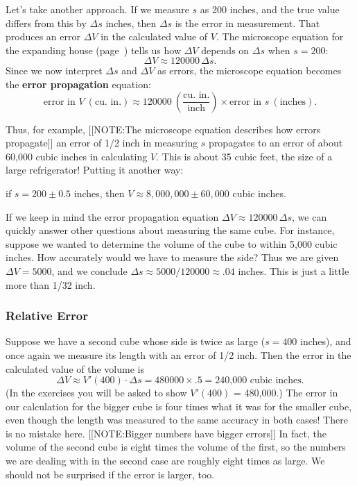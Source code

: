 Let's take another approach.  If we measure $s$ as 200 inches, and the
true value differs from this by $\Delta s$ inches, then $\Delta s$ is
the error in measurement.  That produces an error $\Delta V$ in the
calculated value of $V$.  The microscope equation for the expanding
house (page~\pageref{house}) tells us how $\Delta V$ depends on
$\Delta s$ when $s = 200$:
\[
\Delta V \approx 120000\,\Delta s.
\]
Since we now interpret $\Delta s$ and $\Delta V$ as errors, the
microscope equation becomes the {\bf error propagation} equation:
\[
\mbox{error in $V$} \ (\mbox{cu.\ in.}) \approx 120000 
		\ \left(\dfrac{\mbox{cu.\ in.}}{\mbox{inch}}\right) 
		\times \mbox{error in $s$} \ (\mbox{inches}).
\]

Thus, for example, 
[[NOTE:The microscope equation describes how errors propagate]]
an error of 1/2 inch in measuring $s$ propagates to an error of about
60,000 cubic inches in calculating $V$.  This is about 35 cubic feet,
the size of a large refrigerator!  Putting it another way:
	\begin{center}
	if $s = 200 \pm 0.5$ inches, then $V \approx 8,000,000 
		\pm 60,000$ cubic inches.
	\end{center}

If we keep in mind the error propagation equation $\Delta V \approx
120000\,\Delta s$, we can quickly answer other questions about
measuring the same cube.  For instance, suppose we wanted to determine
the volume of the cube to within 5,000 cubic inches.  How accurately
would we have to measure the side?  Thus we are given $\Delta V =
5000$, and we conclude $\Delta s \approx 5000/120000 \approx .04$
inches.  This is just a little more than 1/32 inch.

\subsubsection{Relative Error}
\label{subsubsec:relative-error}

Suppose we have a second cube whose side is twice as large ($s = 400$
inches), and once again we measure its length with an error of 1/2
inch.  Then the error in the calculated value of the volume is
\[
\Delta V \approx  V'(400) \cdot \Delta s = 
		480000 \times .5 = \mbox{240,000 cubic inches.}
\]
(In the exercises you will be asked to show $V'(400)$ = 480,000.)  The
error in our calculation for the bigger cube is four times what it was
for the smaller cube, even though the length was measured to the same
accuracy in both cases!  There is no mistake here.  
[[NOTE:Bigger numbers  have bigger errors]] 
In fact, the volume of the second cube is eight times the volume of
the first, so the numbers we are dealing with in the second case are
roughly eight times as large.  We should not be surprised if the error
is larger, too.

